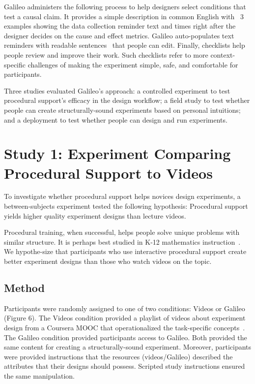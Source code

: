 Galileo administers the following process to help designers select conditions that test a causal claim. It provides a simple description in common English with ~3 examples showing the data collection reminder text and times right after the designer decides on the cause and effect metrics. Galileo auto-populates text reminders with readable sentences~\cite{Levy2013} that people can edit. Finally, checklists help people review and improve their work. Such checklists refer to more context-specific challenges of making the experiment simple, safe, and comfortable for participants.
 
Three studies evaluated Galileo’s approach: a controlled experiment to test procedural support’s efficacy in the design workflow; a field study to test whether people can create structurally-sound experiments based on personal intuitions; and a deployment to test whether people can design and run experiments. 

\section{Study 1: Experiment Comparing Procedural Support to Videos}
To investigate whether procedural support helps novices design experiments, a between-subjects experiment tested the following hypothesis: Procedural support yields higher quality experiment designs than lecture videos. 

Procedural training, when successful, helps people solve unique problems with similar structure. It is perhaps best studied in K-12 mathematics instruction~\cite{Rittle-Johnson1999}. We hypothe-size that participants who use interactive procedural support create better experiment designs than those who watch videos on the topic. 

\subsection{Method}
Participants were randomly assigned to one of two conditions: Videos or Galileo (Figure 6). The Videos condition provided a playlist of videos about experiment design from a Coursera MOOC that operationalized the task-specific concepts~\cite{Wobbrock2018}. The Galileo condition provided participants access to Galileo. Both provided the same content for creating a structurally-sound experiment. Moreover, participants were provided instructions that the resources (videos/Galileo) described the attributes that their designs should possess. Scripted study instructions ensured the same manipulation. 

